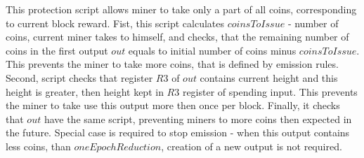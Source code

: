 This protection script allows miner to take only a part of all coins, corresponding to current block reward.
Fist, this script calculates $coinsToIssue$ - number of coins, current miner takes to himself,
and checks, that the remaining  number of coins in the first output $out$ equals to initial
number of coins minus $coinsToIssue$.
This prevents the miner to take more coins, that is defined by emission rules.
Second, script checks that register $R3$ of $out$ contains current height and this height is greater, then height
kept in $R3$ register of spending input.
This prevents the miner to take use this output more then once per block.
Finally, it checks that $out$ have the same script, preventing miners to more coins then expected in the future.
Special case is required to stop emission - when this output contains less coins, than $oneEpochReduction$,
creation of a new output is not required.
